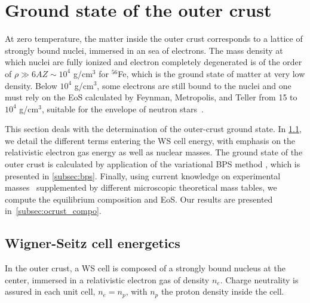 \minitoc\newpage

\section{Ground state of the outer crust}\label{sec:ocrust_gs}

At zero temperature, the matter inside the outer crust corresponds to a 
lattice of strongly bound nuclei, immersed in an sea of electrons. The mass 
density at which nuclei are fully ionized and electron completely degenerated 
is of the order of $\rho \gg 6AZ \sim 10^4$ g/cm$^3$ for $^{56}$Fe, which is
the ground state of matter at very low density. Below $10^4$ g/cm$^3$, some 
electrons are still bound to the nuclei and one must rely on the EoS 
calculated by Feynman, Metropolis, and Teller from 15 to $10^4$ g/cm$^3$, 
suitable for the envelope of neutron stars~\cite{Feynman1949}.

This section deals with the determination of the outer-crust ground state. 
In \ref{subsec:ws}, we detail the different terms entering the WS cell 
energy, with emphasis on the relativistic electron gas energy as well as 
nuclear masses. The ground state of the outer crust is calculated by
application of the variational BPS method \cite{BPS}, which is 
presented in \ref{subsec:bps}. Finally, using current knowledge on experimental
masses~\cite{Huang2017} supplemented by different microscopic theoretical mass
tables, we compute the equilibrium composition and EoS. Our results are
presented in~\ref{subsec:ocrust_compo}.

\subsection{Wigner-Seitz cell energetics}\label{subsec:ws}

In the outer crust, a WS cell is composed of a strongly bound nucleus at the 
center, immersed in a relativistic electron gas of 
density $n_e$. Charge neutrality is assured in each unit cell, 
$n_e = n_p$, with $n_p$ the proton density inside the cell.

